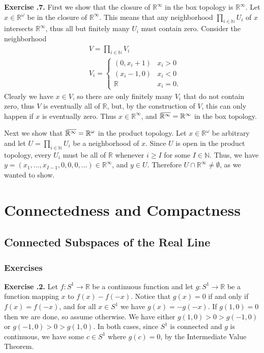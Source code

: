 \documentclass{report}
\theoremstyle{definition}
\theoremstyle{remark}
\newenvironment{exc}[1]{\noindent\textbf{Exercise \thesection.#1.}}{\medskip}
\newcommand{\N}{\mathbb{N}}
\newcommand{\R}{\mathbb{R}}
\newcommand{\closure}[2][3]{%
{}\mkern#1mu\overline{\mkern-#1mu#2}}
\begin{document}
\begin{exc}{7}
    First we show that the closure of $\R^\infty$ in the box topology is $\R^\infty$. Let $x \in \R^\omega$ be in the closure of $\R^\infty$. This means that any neighborhood $\prod_{i \in \N} U_i$ of $x$ intersects $\R^\infty$, thus all but finitely many $U_i$ must contain zero. Consider the neighborhood 
    \begin{align*}
        &V = \prod_{i \in \N} V_i \\
        &V_i = \begin{cases}
        (0, x_i + 1) & x_i > 0 \\
        (x_i-1, 0) & x_i < 0 \\
        \R & x_i = 0.
        \end{cases}
    \end{align*}
    Clearly we have $x \in V$, so there are only finitely many $V_i$ that do not contain zero, thus $V$ is eventually all of $\R$, but, by the construction of $V$, this can only happen if $x$ is eventually zero. Thus $x \in \R^\infty$, and $\closure{\R^\infty} = \R^\infty$ in the box topology.
    
    Next we show that $\closure{\R^\infty} = \R^\omega$ in the product topology. Let $x \in \R^\omega$ be arbitrary and let $U = \prod_{i \in \N} U_i$ be a neighborhood of $x$. Since $U$ is open in the product topology, every $U_i$ must be all of $\R$ whenever $i \geq I$ for some $I \in \N$. Thus, we have $y = (x_1, \dots, x_{I-1}, 0, 0, 0, \dots) \in \R^\infty$, and $y \in U$. Therefore $U \cap \R^\infty \neq \emptyset$, as we wanted to show.
    
\end{exc}

\chapter{Connectedness and Compactness}

\setcounter{section}{23}
\section{Connected Subspaces of the Real Line}
\subsection*{Exercises}
\begin{exc}{2}
 Let $f : S^1 \to \R$ be a continuous function and let $g : S^1 \to \R$ be a function mapping $x$ to $f(x)-f(-x)$. Notice that $g(x) = 0$ if and only if $f(x)=f(-x)$, and for all $x \in S^1$ we have $g(x) = -g(-x)$. If $g(1, 0) = 0$ then we are done, so assume otherwise. We have either $g(1, 0) > 0 > g(-1, 0)$ or $g(-1, 0) > 0 > g(1, 0)$. In both cases, since $S^1$ is connected and $g$ is continuous, we have some $c \in S^1$ where $g(c) = 0$, by the Intermediate Value Theorem.
\end{exc}
\end{document}
